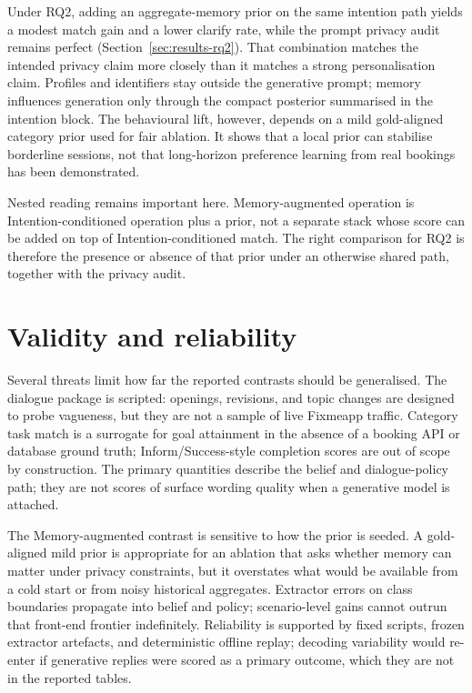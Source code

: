 Under RQ2, adding an aggregate-memory prior on the same intention path yields a modest match gain and a lower clarify rate, while the prompt privacy audit remains perfect (Section~\ref{sec:results-rq2}).
That combination matches the intended privacy claim more closely than it matches a strong personalisation claim.
Profiles and identifiers stay outside the generative prompt; memory influences generation only through the compact posterior summarised in the intention block.
The behavioural lift, however, depends on a mild gold-aligned category prior used for fair ablation.
It shows that a local prior can stabilise borderline sessions, not that long-horizon preference learning from real bookings has been demonstrated.

Nested reading remains important here.
Memory-augmented operation is Intention-conditioned operation plus a prior, not a separate stack whose score can be added on top of Intention-conditioned match.
The right comparison for RQ2 is therefore the presence or absence of that prior under an otherwise shared path, together with the privacy audit.

\section{Validity and reliability}
\label{sec:discussion-validity}

Several threats limit how far the reported contrasts should be generalised.
The dialogue package is scripted: openings, revisions, and topic changes are designed to probe vagueness, but they are not a sample of live Fixmeapp traffic.
Category task match is a surrogate for goal attainment in the absence of a booking API or database ground truth; Inform/Success-style completion scores are out of scope by construction.
The primary quantities describe the belief and dialogue-policy path; they are not scores of surface wording quality when a generative model is attached.

The Memory-augmented contrast is sensitive to how the prior is seeded.
A gold-aligned mild prior is appropriate for an ablation that asks whether memory can matter under privacy constraints, but it overstates what would be available from a cold start or from noisy historical aggregates.
Extractor errors on class boundaries propagate into belief and policy; scenario-level gains cannot outrun that front-end frontier indefinitely.
Reliability is supported by fixed scripts, frozen extractor artefacts, and deterministic offline replay; decoding variability would re-enter if generative replies were scored as a primary outcome, which they are not in the reported tables.

